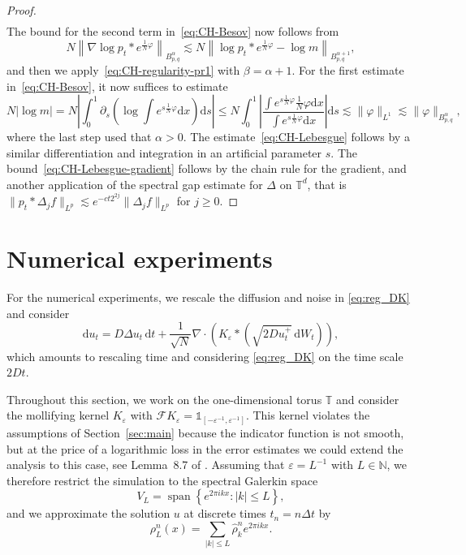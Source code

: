 \documentclass[a4paper,12pt]{article}
\newcommand{\mathd}{\mathrm{d}}
\newcommand{\T}{\mathbb{T}}
\newcommand{\N}{\mathbb{N}}
\begin{document}
\begin{proof}
\begin{align}
    \end{align}
    The bound for the second term in~\eqref{eq:CH-Besov} now follows from
    \[
        N \left\| \nabla \log p_t \ast e^{\tfrac1N\varphi} \right\|_{B^\alpha_{p,q}} \lesssim N \left\| \log p_t \ast e^{\tfrac1N\varphi} - \log m\right\|_{B^{\alpha+1}_{p,q}},
    \]
    and then we apply~\eqref{eq:CH-regularity-pr1} with $\beta=\alpha+1$. For the first estimate in~\eqref{eq:CH-Besov}, 
    it now suffices to estimate
    \[
        N |\log m| = N \left| \int_0^1 \partial_s \left(\log \int e^{s\tfrac1N \varphi} \mathd x \right)\mathd s\right| \leq N  \int_0^1 \left| \frac{\int e^{s\tfrac1N \varphi} \frac1N \varphi \mathd x}{\int e^{s\tfrac1N  \varphi} \mathd x}\right| \mathd s \lesssim \|\varphi\|_{L^1} \lesssim \|\varphi\|_{B^\alpha_{p,q}},
    \]
    where the last step used that $\alpha>0$. The estimate~\eqref{eq:CH-Lebesgue} follows by a similar differentiation and integration in an artificial parameter $s$. The bound~\eqref{eq:CH-Lebesgue-gradient} follows by the chain rule for the gradient, and another application of the spectral gap estimate for $\Delta$ on $\T^d$, that is $\|p_t \ast \Delta_j f\|_{L^p} \lesssim e^{-ct2^{2j}} \|\Delta_j f \|_{L^p}$ for $j \geq 0$.
\end{proof}


\section{Numerical experiments}\label{sec:numerics}


For the numerical experiments, we rescale the diffusion and noise in \eqref{eq:reg_DK} and consider
\begin{equation}
\mathrm{d}u_t
=
D\Delta u_t\,\mathrm{d}t
+
\frac{1}{\sqrt{N}}
\nabla\cdot
\left(
K_\varepsilon*
\left(
\sqrt{2D u_t^+}\,\mathrm{d}W_t
\right)
\right),
\label{eq:reg_DK_diffusivity}
\end{equation}
which amounts to rescaling time and considering \eqref{eq:reg_DK} on the time scale $2 D t$.

Throughout this section, we work on the one-dimensional torus $\mathbb{T}$ and
consider the mollifying kernel $K_\varepsilon$ with $\mathcal F K_\varepsilon = \mathds{1}_{[-\varepsilon^{-1},\varepsilon^{-1}]}$.
 This kernel violates the assumptions of Section~\ref{sec:main} because the indicator function is not smooth, but at the price of a logarithmic loss in the error estimates we could extend the analysis to this case, see Lemma~8.7 of \cite{Gubinelli2017KPZ}. Assuming that $\varepsilon = L^{-1}$ with $L \in \N$, we therefore restrict the simulation to the spectral Galerkin space
\[
V_L
=
\operatorname{span}
\left\{
e^{2\pi ikx}:|k|\leq L
\right\},
\]
and we approximate the solution $u$ at discrete times $t_n=n\Delta t$ by
\[
\rho_L^n(x)
=
\sum_{|k|\leq L}
\widehat{\rho}_k^n e^{2\pi ikx}.
\]
\end{document}
